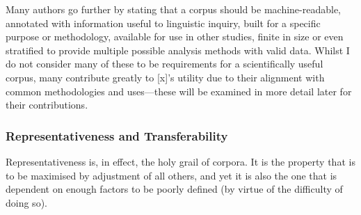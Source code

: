 Many authors %
go further by stating that a corpus should be machine-readable, annotated with information useful to linguistic inquiry, built for a specific purpose or methodology, available for use in other studies, finite in size or even stratified to provide multiple possible analysis methods with valid data.  Whilst I do not consider many of these to be requirements for a scientifically useful corpus, many contribute greatly to [x]'s utility due to their alignment with common methodologies and uses---these will be examined in more detail later for their contributions.













\subsubsection{Representativeness and Transferability}
Representativeness is, in effect, the holy grail of corpora.  It is the property that is to be maximised by adjustment of all others, and yet it is also the one that is dependent on enough factors to be poorly defined (by virtue of the difficulty of doing so).

